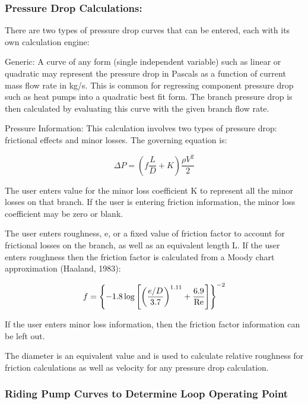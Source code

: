 \subsubsection{Pressure Drop Calculations:}\label{pressure-drop-calculations}

There are two types of pressure drop curves that can be entered, each with its own calculation engine:

Generic: A curve of any form (single independent variable) such as linear or quadratic may represent the pressure drop in Pascals as a function of current mass flow rate in kg/s. This is common for regressing component pressure drop such as heat pumps into a quadratic best fit form. The branch pressure drop is then calculated by evaluating this curve with the given branch flow rate.

Pressure Information: This calculation involves two types of pressure drop: frictional effects and minor losses. The governing equation is:

\begin{equation}
\Delta P = \left( {f\frac{L}{D} + K} \right)\frac{{\rho {V^2}}}{2}
\end{equation}

The user enters value for the minor loss coefficient K to represent all the minor losses on that branch. If the user is entering friction information, the minor loss coefficient may be zero or blank.

The user enters roughness, e, or a fixed value of friction factor to account for frictional losses on the branch, as well as an equivalent length L. If the user enters roughness then the friction factor is calculated from a Moody chart approximation (Haaland, 1983):

\begin{equation}
f = {\left\{ { - 1.8\log \left[ {{{\left( {\frac{{e/D}}{{3.7}}} \right)}^{1.11}} + \frac{{6.9}}{{{\mathop{\rm Re}\nolimits} }}} \right]} \right\}^{ - 2}}
\end{equation}

If the user enters minor loss information, then the friction factor information can be left out.

The diameter is an equivalent value and is used to calculate relative roughness for friction calculations as well as velocity for any pressure drop calculation.

\subsubsection{Riding Pump Curves to Determine Loop Operating Point}\label{riding-pump-curves-to-determine-loop-operating-point}

